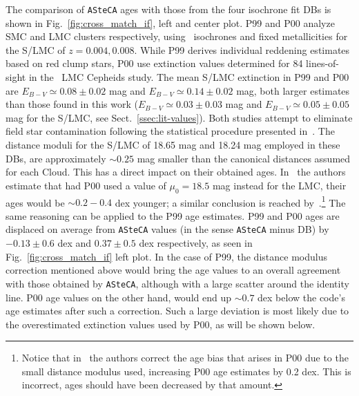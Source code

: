 \documentclass{aa}
\begin{document}
%
%
The comparison of \texttt{ASteCA} ages with those from the four isochrone
fit DBs is shown in Fig.~\ref{fig:cross_match_if}, left and center plot.
%
P99 and P00 analyze SMC and LMC clusters respectively,
using~\cite{Bertelli_1994} isochrones and fixed metallicities for the S/LMC of
$z{=}0.004, 0.008$. While P99 derives individual reddening estimates based on
red clump stars, P00 use extinction values determined for 84 lines-of-sight
in the~\cite{Udalski_1999} LMC Cepheids study. The mean S/LMC extinction in P99
and P00 are $E_{B-V}{\simeq}0.08{\pm}0.02$ mag and $E_{B-V}{\simeq}0.14
{\pm}0.02$ mag, both larger estimates than those found in this work
($E_{B-V}{\simeq}0.03{\pm}0.03$ mag and $E_{B-V}{\simeq}0.05{\pm}0.05$ mag for
the S/LMC, see Sect.~\ref{ssec:lit-values}).
%
Both studies attempt to eliminate field star contamination following the
statistical procedure presented in~\cite{Mateo_1986}.
The distance moduli for the S/LMC of 18.65 mag and 18.24 mag employed in
these DBs, are approximately ${\sim}0.25$ mag smaller than the canonical
distances assumed for each Cloud. This has a direct impact on their obtained
ages.
%
In~\cite{de_Grijs_2006} the authors estimate that had P00 used a value
of $\mu_0{=}18.5$ mag instead for the LMC, their ages would be ${\sim}0.2{-}0.4$
dex younger; a similar conclusion is reached
by~\cite{Baumgardt_2013}.\footnote{Notice that in~\cite{Baumgardt_2013} the
authors correct the age bias that arises in P00 due to the small distance
modulus used, increasing P00 age estimates by 0.2 dex. This is incorrect, ages
should have been decreased by that amount.} The same reasoning can be applied to
the P99 age estimates.\@
%
P99 and P00 ages are displaced on average from \texttt{ASteCA} values (in the
sense \texttt{ASteCA} minus DB) by $-0.13{\pm}0.6$ dex and $0.37{\pm}0.5$ dex
respectively, as seen in Fig.~\ref{fig:cross_match_if} left plot.
In the case of P99, the distance modulus correction mentioned above would
bring the age values to an overall agreement with those obtained by
\texttt{ASteCA}, although with a large scatter around the identity line.
%
P00 age values on the other hand, would end up ${\sim}0.7$ dex below the code's
age estimates after such a correction. Such a large deviation is most likely due
to the overestimated extinction values used by P00, as will be shown below.
\end{document}

